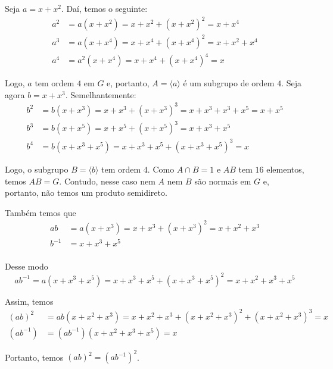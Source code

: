 	\par\vspace{0.3cm} Seja $a = x+x^2$. Daí, temos o seguinte:
	\begin{align*}
	a^2 &= a(x+x^2) = x+x^2+(x+x^2)^2 = x+x^4 \\
	a^3 &= a(x+x^4) = x+x^4+(x+x^4)^2 = x+x^2+x^4 \\
	a^4 &= a^2(x+x^4) = x+x^4+(x+x^4)^4 = x
	\end{align*}
	\par\vspace{0.3cm} Logo, $a$ tem ordem $4$ em $G$ e, portanto, $A = \langle a \rangle$ é um subgrupo de ordem $4$. Seja agora $b = x+x^3$. Semelhantemente:
	\begin{align*}
	b^2 &= b(x+x^3) = x+x^3 + (x+x^3)^3 = x+x^3+x^3+x^5 = x+x^5 \\
	b^3 &= b(x+x^5) = x+x^5+(x+x^5)^3 = x+x^3+x^5 \\
	b^4 &= b(x+x^3+x^5) = x+x^3+x^5+(x+x^3+x^5)^3 = x
	\end{align*}
	\par\vspace{0.3cm} Logo, o subgrupo $B = \langle b \rangle$ tem ordem $4$. Como $A\cap B = 1$ e $AB$ tem $16$ elementos, temos $AB=G$. Contudo, nesse caso nem $A$ nem $B$ são normais em $G$ e, portanto, não temos um produto semidireto. 
	\par\vspace{0.3cm} Também temos que
	\begin{align*}
	ab &= a(x+x^3) = x+x^3+(x+x^3)^2 = x+x^2+x^3 \\
	b^{-1} &= x+x^3+x^5 \\
	\end{align*}
	\par Desse modo
	\begin{equation*}
	ab^{-1} = a(x+x^3+x^5) = x+x^3+x^5+(x+x^3+x^5)^2 = x+x^2+x^3+x^5
	\end{equation*}
	\par\vspace{0.3cm} Assim, temos
	\begin{align*}
	(ab)^2 &= ab(x+x^2+x^3) = x+x^2+x^3 + (x+x^2+x^3)^2 + (x+x^2+x^3)^3 = x \\
	(ab^{-1}) &= (ab^{-1})(x+x^2+x^3+x^5) = x
	\end{align*}
	\par\vspace{0.3cm} Portanto, temos $(ab)^2=(ab^{-1})^2$.